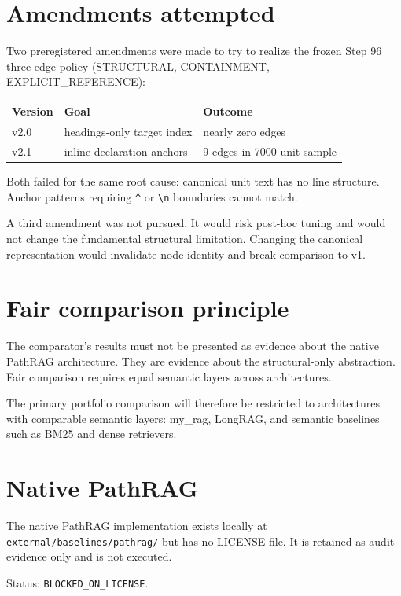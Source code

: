\documentclass[11pt,a4paper]{article}
\begin{document}
\section{Amendments attempted}

Two preregistered amendments were made to try to realize
the frozen Step 96 three-edge policy (STRUCTURAL, CONTAINMENT,
EXPLICIT\_REFERENCE):

\begin{longtable}{lll}
\toprule
Version & Goal & Outcome \\ \midrule
v2.0 & headings-only target index & nearly zero edges \\
v2.1 & inline declaration anchors & 9 edges in 7000-unit sample \\
\bottomrule
\end{longtable}

Both failed for the same root cause: canonical unit text has
no line structure. Anchor patterns requiring \texttt{\^{}} or
\texttt{\textbackslash n} boundaries cannot match.

A third amendment was not pursued. It would risk post-hoc
tuning and would not change the fundamental structural
limitation. Changing the canonical representation would
invalidate node identity and break comparison to v1.

\section{Fair comparison principle}

The comparator's results must not be presented as evidence
about the native PathRAG architecture. They are evidence about
the structural-only abstraction. Fair comparison requires
equal semantic layers across architectures.

The primary portfolio comparison will therefore be restricted
to architectures with comparable semantic layers: my\_rag,
LongRAG, and semantic baselines such as BM25 and dense
retrievers.

\section{Native PathRAG}

The native PathRAG implementation exists locally at
\texttt{external/baselines/pathrag/} but has no LICENSE file.
It is retained as audit evidence only and is not executed.

Status: \texttt{BLOCKED\_ON\_LICENSE}.
\end{document}
